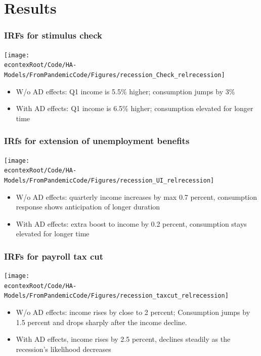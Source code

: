 \documentclass[pdflatex,aspectratio=169]{beamer}
\begin{document}
\section{Results}


\begin{frame}
\frametitle{IRFs for stimulus check}
\centering
\texttt{[image: \\econtexRoot/Code/HA-Models/FromPandemicCode/Figures/recession\_Check\_relrecession]}
\begin{itemize}
	\itemsep = .5\bigskipamount 
	\item W/o AD effects: Q1 income is 5.5\% higher; consumption jumps by 3\% 
	\item With AD effects: Q1 income is 6.5\% higher; consumption elevated for longer time
\end{itemize}
\end{frame}


\begin{frame}
\frametitle{IRfs for extension of unemployment benefits}
	\centering
	\texttt{[image: \\econtexRoot/Code/HA-Models/FromPandemicCode/Figures/recession\_UI\_relrecession]}
\begin{itemize}
	\itemsep = .5\bigskipamount 
	\item W/o AD effects: quarterly income increases by max 0.7 percent, consumption response shows anticipation of longer duration
	\item With AD effects: extra boost to income by 0.2 percent, consumption stays elevated for longer time
\end{itemize}

\end{frame}

\begin{frame}
\frametitle{IRFs for payroll tax cut}
	\centering
	\texttt{[image: \\econtexRoot/Code/HA-Models/FromPandemicCode/Figures/recession\_taxcut\_relrecession]}

\begin{itemize}
	\itemsep = .5\bigskipamount 
	\item W/o AD effects: income rises by close to 2 percent; Consumption jumps by 1.5 percent and drops sharply after the income decline.
	\item With AD effects, income rises by 2.5 percent, declines steadily as the recession's likelihood decreases
\end{itemize}
\end{frame}
\end{document}
